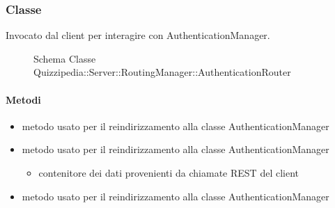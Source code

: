 \subsubsection{Classe }
Invocato dal client per interagire con AuthenticationManager.
\begin{figure}[H]
\centering
\noindent{}
\caption[Schema Classe AuthenticationRouter]{Schema Classe Quizzipedia::Server::RoutingManager::AuthenticationRouter}
\end{figure}
\paragraph{Metodi}
\begin{itemize}
\item {}
\newline
metodo usato per il reindirizzamento alla classe AuthenticationManager
\newline
\item {}
\newline
metodo usato per il reindirizzamento alla classe AuthenticationManager
\newline
{}
\newline
\begin{itemize}
\item {}
\newline
contenitore dei dati provenienti da chiamate REST del client
\end{itemize}
\item {}
\newline
metodo usato per il reindirizzamento alla classe AuthenticationManager
\newline
\end{itemize}
